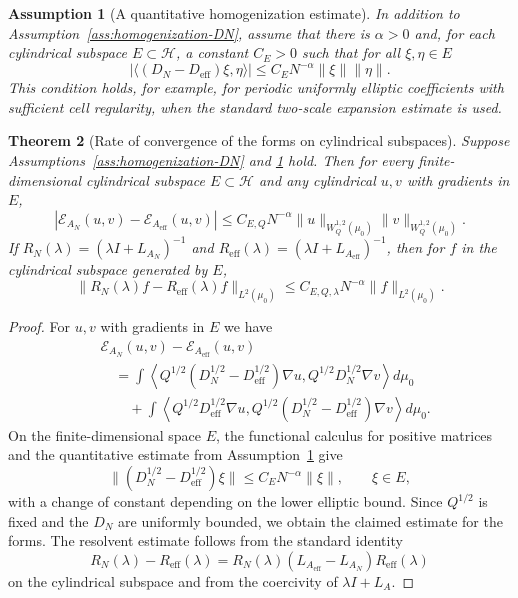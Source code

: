\documentclass{article}
\newtheorem{theorem}{Theorem}[section]
\newtheorem{assumption}[theorem]{Assumption}
\newcommand{\Hh}{\mathcal H}
\begin{document}
\begin{assumption}[A quantitative homogenization estimate]
\label{ass:quant-homogenization}
In addition to Assumption~\ref{ass:homogenization-DN}, assume that there is
\(\alpha>0\) and, for each cylindrical subspace \(E\subset\Hh\), a constant
\(C_E>0\) such that for all \(\xi,\eta\in E\)
\[
        \left|
        \langle (D_N-D_{\mathrm{eff}})\xi,\eta\rangle
        \right|
        \le C_E N^{-\alpha}\|\xi\|\|\eta\| .
\]
This condition holds, for example, for periodic uniformly elliptic
coefficients with sufficient cell regularity, when the standard two-scale
expansion estimate is used.
\end{assumption}

\begin{theorem}[Rate of convergence of the forms on cylindrical subspaces]
\label{thm:quant-homogenization-A}
Suppose Assumptions~\ref{ass:homogenization-DN} and
\ref{ass:quant-homogenization} hold. Then for every finite-dimensional
cylindrical subspace \(E\subset\Hh\) and any cylindrical \(u,v\) with gradients
in \(E\),
\[
        \left|
        \mathcal E_{A_N}(u,v)-
        \mathcal E_{A_{\mathrm{eff}}}(u,v)
        \right|
        \le
        C_{E,Q}N^{-\alpha}
        \|u\|_{W_Q^{1,2}(\mu_0)}
        \|v\|_{W_Q^{1,2}(\mu_0)} .
\]
If \(R_N(\lambda)=(\lambda I+L_{A_N})^{-1}\) and
\(R_{\mathrm{eff}}(\lambda)=(\lambda I+L_{A_{\mathrm{eff}}})^{-1}\), then for
\(f\) in the cylindrical subspace generated by \(E\),
\[
        \|R_N(\lambda)f-R_{\mathrm{eff}}(\lambda)f\|_{L^2(\mu_0)}
        \le C_{E,Q,\lambda}N^{-\alpha}\|f\|_{L^2(\mu_0)} .
\]
\end{theorem}

\begin{proof}
For \(u,v\) with gradients in \(E\) we have
\[
\begin{aligned}
&\mathcal E_{A_N}(u,v)-\mathcal E_{A_{\mathrm{eff}}}(u,v)\\
&\quad=
\int
\left\langle
Q^{1/2}(D_N^{1/2}-D_{\mathrm{eff}}^{1/2})\nabla u,
Q^{1/2}D_N^{1/2}\nabla v
\right\rangle d\mu_0 \\
&\qquad+
\int
\left\langle
Q^{1/2}D_{\mathrm{eff}}^{1/2}\nabla u,
Q^{1/2}(D_N^{1/2}-D_{\mathrm{eff}}^{1/2})\nabla v
\right\rangle d\mu_0 .
\end{aligned}
\]
On the finite-dimensional space \(E\), the functional calculus for positive
matrices and the quantitative estimate from
Assumption~\ref{ass:quant-homogenization} give
\[
        \|(D_N^{1/2}-D_{\mathrm{eff}}^{1/2})\xi\|
        \le C_E N^{-\alpha}\|\xi\|,
        \qquad \xi\in E,
\]
with a change of constant depending on the lower elliptic bound. Since
\(Q^{1/2}\) is fixed and the \(D_N\) are uniformly bounded, we obtain the
claimed estimate for the forms. The resolvent estimate follows from the
standard identity
\[
        R_N(\lambda)-R_{\mathrm{eff}}(\lambda)
        =R_N(\lambda)(L_{A_{\mathrm{eff}}}-L_{A_N})R_{\mathrm{eff}}(\lambda)
\]
on the cylindrical subspace and from the coercivity of
\(\lambda I+L_A\).
\end{proof}
\end{document}
